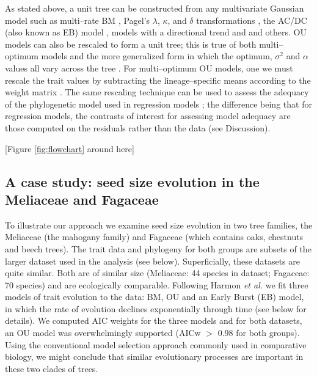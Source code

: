 \documentclass[a4paper,12pt]{article}
\begin{document}
As stated above, a unit tree can be constructed from any multivariate Gaussian model such as multi--rate BM \citep{Omeara2006, Thomas2006, Eastman2011, Revell2012}, Pagel's $\lambda$, $\kappa$, and $\delta$ transformations \citep{Pagel1997, Pagel1999}, the AC/DC (also known as EB) model \citep{Blomberg2003, Harmon2010}, models with a directional trend \citep{Hunt2007} and and others. OU models can also be rescaled to form a unit tree; this is true of both multi--optimum \citep{ButlerKing2004} models and the more generalized form \citep{Beaulieu2012} in which the optimum, $\sigma^2$ and $\alpha$ values all vary across the tree \citep{HoAne2013}. For multi--optimum OU models, one we must rescale the trait values by subtracting the lineage--specific means according to the weight matrix \citep[see][]{Hansen1997, ButlerKing2004, Beaulieu2012, UyedaBayou}. The same rescaling technique can be used to assess the adequacy of the phylogenetic model used in regression models \citep{Grafen1989, Rohlf2001}; the difference being that for regression models, the contrasts of interest for assessing model adequacy are those computed on the residuals rather than the data (see Discussion).

[Figure \ref{fig:flowchart} around here]

\subsection{A case study: seed size evolution in the Meliaceae and Fagaceae }
To illustrate our approach we examine seed size evolution in two tree families, the Meliaceae (the mahogany family) and Fagaceae (which contains oaks, chestnuts and beech trees). The trait data and phylogeny for both groups are subsets of the larger dataset used in the analysis (see below). Superficially, these datasets are quite similar. Both are of similar size (Meliaceae: 44 species in dataset; Fagaceae: 70 species) and are ecologically comparable. Following Harmon \textit{et al.} \citep{Harmon2010} we fit three models of trait evolution to the data: BM, OU and an Early Burst (EB) model, in which the rate of evolution declines exponentially through time \citep{Blomberg2003, Harmon2010} (see below for details). We computed AIC weights \citep{aicweight} for the three models and for both datasets, an OU model was overwhelmingly supported (AICw $>$ 0.98 for both groups). Using the conventional model selection approach commonly used in comparative biology, we might conclude that similar evolutionary processes are important in these two clades of trees.
\end{document}

